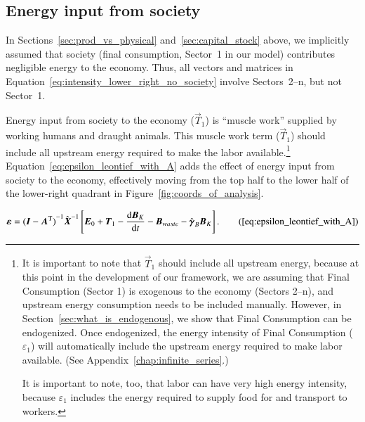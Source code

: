 \subsection{Energy input from society}
\label{sec:energy_from_society}

In Sections~\ref{sec:prod_vs_physical}
and~\ref{sec:capital_stock} above,
we implicitly assumed that society 
(final consumption, Sector~1 in our model)
contributes negligible energy to the economy.
Thus, all vectors and matrices in Equation~\ref{eq:intensity_lower_right_no_society}
involve Sectors~2--n, but not Sector~1.

Energy input from society to the economy ($\vec{T}_{1}$)
is ``muscle work'' supplied by working humans 
and draught animals.\cite{Ayres:2003ec,Ayres:2010ug,Warr:2012cg} 
This muscle work term ($\vec{T}_{1}$) should include
all upstream energy required to make the labor available.\footnote{It is important
	to note that $\vec{T}_{1}$ should include all upstream energy,
	because at this point in the development of our framework,
	we are assuming that Final Consumption (Sector 1) is exogenous to the economy 
	(Sectors 2--n), 
	and upstream energy consumption needs to be included manually.
	However, in Section~\ref{sec:what_is_endogenous}, we show that Final Consumption
	can be endogenized.
	Once endogenized, the energy intensity of Final Consumption ($\varepsilon_{1}$) 
	will automatically include the upstream energy required to make labor available.
	(See Appendix~\ref{chap:infinite_series}.)

	It is important to note, too, that labor can have very high energy intensity, 
	because $\varepsilon_{1}$ includes the energy required to supply food 
	for and transport to workers.} 
Equation~\ref{eq:epsilon_leontief_with_A} 
adds the effect of energy input from society to the economy,
effectively moving from the top half to the lower half of the lower-right quadrant
in Figure~\ref{fig:coords_of_analysis}.

\begin{equation}
	\boldsymbol{\varepsilon} 
	= {(\vec{I} - \vec{A}^{\mathrm{T}})}^{-1}\hat{\vec{X}}^{-1}
		\left[\vec{E}_{0} 
				+ \vec{T}_{1} 
				- \frac{\mathrm{d}\vec{B}_{K}}{\mathrm{d}t} 
				- \vec{B}_{waste}
				- \hat{\boldsymbol{\gamma}}_{B}\vec{B}_{K}
		\right].\tag{\ref{eq:epsilon_leontief_with_A}}
\end{equation}

